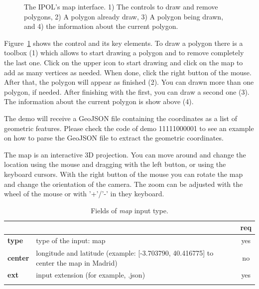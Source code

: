 \begin{figure}[h]
\centering
{}
\caption{The IPOL's map interface. 1) The controls to draw and remove polygons, 2) A polygon already draw, 3) A polygon being drawn, and 4) the information about the current polygon.}
\label{fig:geojson_example}
\end{figure}

Figure~\ref{fig:geojson_example} shows the control and its key elements.
To draw a polygon there is a toolbox (1) which allows to start drawing a polygon and to remove completely the last one. Click on the upper icon to start drawing and click on the map to add as many vertices as needed. When done, click the right button of the mouse. After that, the polygon will appear as finished (2). You can drawn more than one polygon, if needed. After finishing with the first, you can draw a second one (3). The information about the current polygon is show above (4).

The demo will receive a GeoJSON file containing the coordinates as a list of geometric features. Please check the code of demo 11111000001 to see an example on how to parse the GeoJSON file to extract the geometric coordinates.

The map is an interactive 3D projection. You can move around and change the location using the mouse and dragging with the left button, or using the keyboard cursors. With the right button of the mouse you can rotate the map and change the orientation of the camera. The zoom can be adjusted with the wheel of the mouse or with '+'/'-' in they keyboard.

\begin{longtable}{|>{\bf}L{\linewidth}|L{\linewidth}|c|}
\hline
{}     &  & {\bf req} \tabularnewline 
\hline \hline
 type         & type of the input: map & yes \\ \hline
 center         & longitude and latitude (example: [-3.703790, 40.416775] to center the map in Madrid) & no \\ \hline
 ext          & input extension (for example, .json) & yes \\ \hline
\caption{Fields of \emph{map} input type.}
\end{longtable}



